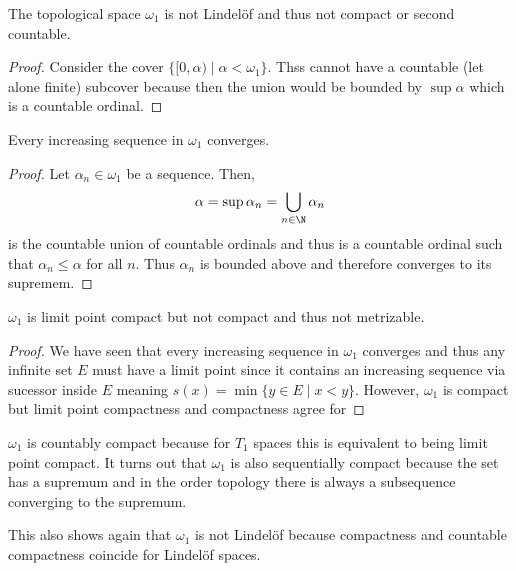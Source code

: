 \documentclass[12pt]{article}
\begin{document}
\begin{prop}
The topological space $\omega_1$ is not Lindel\"{o}f and thus not compact or second countable.
\end{prop}

\begin{proof}
Consider the cover $\{ [0, \alpha) \mid \alpha < \omega_1 \}$. Thss cannot have a countable (let alone finite) subcover because then the union would be bounded by $\sup \alpha$ which is a countable ordinal. 
\end{proof}

\begin{prop}
Every increasing sequence in $\omega_1$ converges.
\end{prop}

\begin{proof}
Let $\alpha_n \in \omega_1$ be a sequence. Then,
\[ \alpha = \sup \alpha_n = \bigcup_{n \in \N} \alpha_n \]
is the countable union of countable ordinals and thus is a countable ordinal such that $\alpha_n \le \alpha$ for all $n$. Thus $\alpha_n$ is bounded above and therefore converges to its supremem.
\end{proof}

\begin{prop}
$\omega_1$ is limit point compact but not compact and thus not metrizable.
\end{prop}

\begin{proof}
We have seen that every increasing sequence in $\omega_1$ converges and thus any infinite set $E$ must have a limit point since it contains an increasing sequence via sucessor inside $E$ meaning $s(x) = \min \{ y \in E \mid x < y \}$. However, $\omega_1$ is compact but limit point compactness and compactness agree for 
\end{proof}

\begin{rmk}
$\omega_1$ is countably compact because for $T_1$ spaces this is equivalent to being limit point compact. It turns out that $\omega_1$ is also sequentially compact because the set has a supremum and in the order topology there is always a subsequence converging to the supremum.
\end{rmk}

\begin{rmk}
This also shows again that $\omega_1$ is not Lindel\"{o}f because compactness and countable compactness coincide for Lindel\"{o}f spaces.
\end{rmk}
\end{document}

